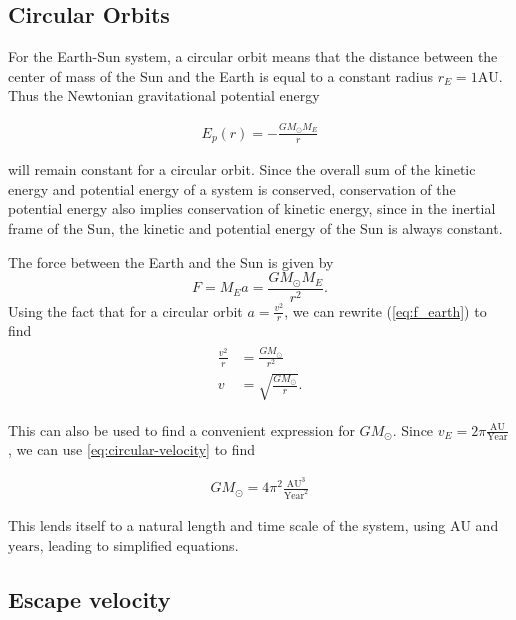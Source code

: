 \documentclass[../main.tex]{subfiles}
\begin{document}
\subsection{Circular Orbits}

For the Earth-Sun system, a circular orbit means that the distance between the center of mass of the Sun and the Earth is equal to a constant radius $r_E = 1 \text{AU}$. Thus the Newtonian gravitational potential energy

\begin{align}
    E_p(r) = -\frac{G M_\odot M_E}{r}
\end{align}

will remain constant for a circular orbit. Since the overall sum of the kinetic energy and potential energy of a system is conserved, conservation of the potential energy also implies conservation of kinetic energy, since in the inertial frame of the Sun, the kinetic and potential energy of the Sun is always constant.

The force between the Earth and the Sun is given by
\begin{equation}\label{eq:f_earth}
    F = M_E a = \frac{GM_\odot M_E}{r^2}.
\end{equation}
Using the fact that for a circular orbit $a = \frac{v^2}{r}$, we can rewrite (\ref{eq:f_earth}) to find
\begin{align}
\begin{split}
    \frac{v^2}{r} &= \frac{GM_\odot}{r^2}\\
    v &= \sqrt{\frac{GM_\odot}{r}}.
\end{split}
\label{eq:circular-velocity}
\end{align}

This can also be used to find a convenient expression for $GM_\odot$. Since $v_E = 2\pi \frac{\text{AU}}{\text{Year}}$, we can use \cref{eq:circular-velocity} to find

\begin{align}
    G M_\odot = 4 \pi^2 \frac{\text{AU}^3}{\text{Year}^2}
    \label{eq:GM-sun}
\end{align}

This lends itself to a natural length and time scale of the system, using $\text{AU}$ and $\text{years}$, leading to simplified equations.

\subsection{Escape velocity}
\end{document}

